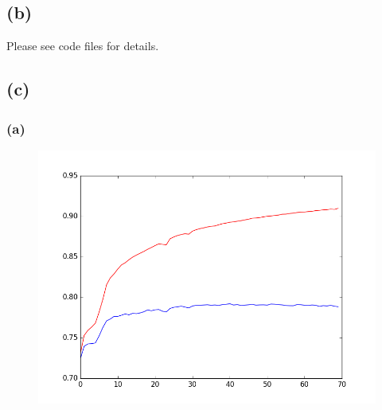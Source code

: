 \documentclass {article}
\begin{document}
\subsection*{(b)}
Please see code files for details.
\subsection*{(c)}
\subsubsection*{(a)}
\begin{figure}[H]
\centering
\includegraphics[width=0.7\linewidth]{ps3_2_c_a}
\caption{}
\label{fig:ps3_2_c_a}
\end{figure}
\end{document}

